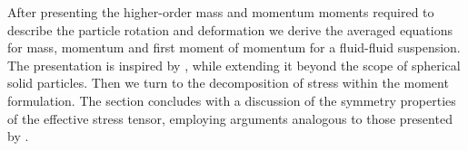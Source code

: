 









After presenting the higher-order mass and momentum moments required to describe the particle rotation and deformation we derive the averaged equations for mass, momentum and first moment of momentum for a fluid-fluid suspension.
The presentation is inspired by \citep{lhuillier2009rheology}, while extending it beyond the scope of spherical solid particles.
Then we turn to the decomposition of stress within the moment formulation. 
The section concludes with a discussion of the symmetry properties of the effective stress tensor, employing arguments analogous to those presented by \citet{lhuillier1996contribution}.

